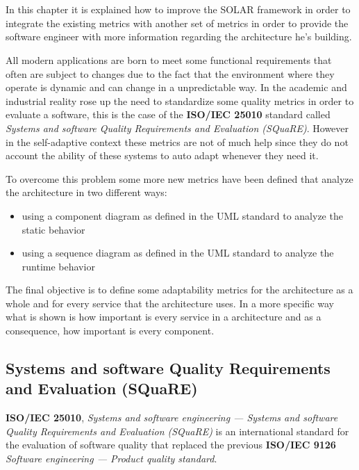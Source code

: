 \chapter{}
\label{cap:}
In this chapter it is explained how to improve the SOLAR framework in order to integrate the existing metrics with another set of metrics in order to provide the software engineer with more information regarding the architecture he's building. 

All modern applications are born to meet some functional requirements that often are subject to changes due to the fact that the environment where they operate is dynamic and can change in a unpredictable way. In the academic and industrial reality rose up the need to standardize some quality metrics in order to evaluate a software, this is the case of the \textbf{ISO/IEC 25010} standard called \emph{Systems and software Quality Requirements and Evaluation (SQuaRE)}\cite{iso/iec-25010}. However in the self-adaptive context these metrics are not of much help since they do not account the ability of these systems to auto adapt whenever they need it.

To overcome this problem some more new metrics have been defined that analyze the architecture in two different ways:
\begin{itemize}
	\item using a component diagram as defined in the UML standard\cite{uml} to analyze the static behavior
	\item using a sequence diagram as defined in the UML standard\cite{uml} to analyze the runtime behavior
\end{itemize}

The final objective is to define some adaptability metrics for the architecture as a whole and for every service that the architecture uses. In a more specific way what is shown is how important is every service in a architecture and as a consequence, how important is every component.

\section{Systems and software Quality Requirements and Evaluation (SQuaRE)}
\label{sec:square}
\textbf{ISO/IEC 25010}, \emph{Systems and software engineering — Systems and software Quality Requirements and Evaluation (SQuaRE)}\cite{iso/iec-25010} is an international standard for the evaluation of software quality that replaced the previous \textbf{ISO/IEC 9126} \emph{Software engineering — Product quality standard}\cite{iso/iec-9126}.

